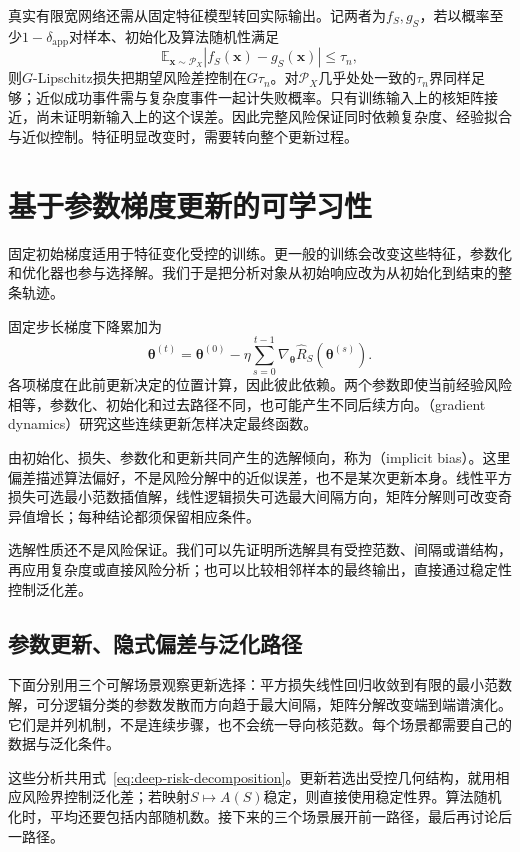 真实有限宽网络还需从固定特征模型转回实际输出。记两者为$f_S,g_S$，若以概率至少$1-\delta_{\mathrm{app}}$对样本、初始化及算法随机性满足
\[
 \mathbb E_{\bm x\sim\mathcal P_X}|f_S(\bm x)-g_S(\bm x)|\leq\tau_n,
\]
则$G$-Lipschitz损失把期望风险差控制在$G\tau_n$。对$\mathcal P_X$几乎处处一致的$\tau_n$界同样足够；近似成功事件需与复杂度事件一起计失败概率。只有训练输入上的核矩阵接近，尚未证明新输入上的这个误差。因此完整风险保证同时依赖复杂度、经验拟合与近似控制。特征明显改变时，需要转向整个更新过程。

\section{基于参数梯度更新的可学习性}
\label{sec:implicit-bias}

固定初始梯度适用于特征变化受控的训练。更一般的训练会改变这些特征，参数化和优化器也参与选择解。我们于是把分析对象从初始响应改为从初始化到结束的整条轨迹。

固定步长梯度下降累加为
\[
 \bm\theta^{(t)}=\bm\theta^{(0)}
 -\eta\sum_{s=0}^{t-1}\nabla_{\bm\theta}\hat R_S(\bm\theta^{(s)}).
\]
各项梯度在此前更新决定的位置计算，因此彼此依赖。两个参数即使当前经验风险相等，参数化、初始化和过去路径不同，也可能产生不同后续方向。（gradient dynamics）研究这些连续更新怎样决定最终函数。

由初始化、损失、参数化和更新共同产生的选解倾向，称为（implicit bias）。这里偏差描述算法偏好，不是风险分解中的近似误差，也不是某次更新本身。线性平方损失可选最小范数插值解，线性逻辑损失可选最大间隔方向，矩阵分解则可改变奇异值增长；每种结论都须保留相应条件。

选解性质还不是风险保证。我们可以先证明所选解具有受控范数、间隔或谱结构，再应用复杂度或直接风险分析；也可以比较相邻样本的最终输出，直接通过稳定性控制泛化差。

\subsection{参数更新、隐式偏差与泛化路径}

下面分别用三个可解场景观察更新选择：平方损失线性回归收敛到有限的最小范数解，可分逻辑分类的参数发散而方向趋于最大间隔，矩阵分解改变端到端谱演化。它们是并列机制，不是连续步骤，也不会统一导向核范数。每个场景都需要自己的数据与泛化条件。

这些分析共用式~\eqref{eq:deep-risk-decomposition}。更新若选出受控几何结构，就用相应风险界控制泛化差；若映射$S\mapsto A(S)$稳定，则直接使用稳定性界。算法随机化时，平均还要包括内部随机数。接下来的三个场景展开前一路径，最后再讨论后一路径。


